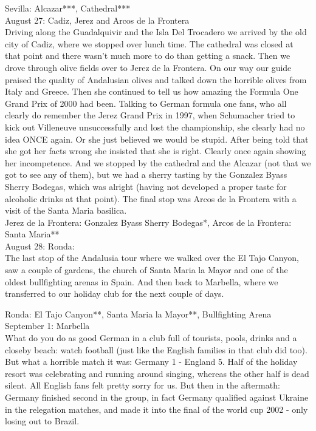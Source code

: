 Sevilla: Alcazar***, Cathedral***\\

August 27: Cadiz, Jerez and Arcos de la Frontera\\
Driving along the Guadalquivir and the Isla Del Trocadero we arrived by the old city of Cadiz, where we stopped over lunch time. The cathedral was closed at that point and there wasn't much more to do than getting a snack. Then we drove through olive fields over to Jerez de la Frontera. On our way our guide praised the quality of Andalusian olives and talked down the horrible olives from Italy and Greece. Then she continued to tell us how amazing the Formula One Grand Prix of 2000 had been. Talking to German formula one fans, who all clearly do remember the Jerez Grand Prix in 1997, when Schumacher tried to kick out Villeneuve unsuccessfully and lost the championship, she clearly had no idea ONCE again. Or she just believed we would be stupid. After being told that she got her facts wrong she insisted that she is right. Clearly once again showing her incompetence. And we stopped by the cathedral and the Alcazar (not that we got to see any of them), but we had a sherry tasting by the Gonzalez Byass Sherry Bodegas, which was alright (having not developed a proper taste for alcoholic drinks at that point). The final stop was Arcos de la Frontera with a visit of the Santa Maria basilica.\\

Jerez de la Frontera: Gonzalez Byass Sherry Bodegas*, Arcos de la Frontera: Santa Maria**\\

August 28: Ronda:\\
The last stop of the Andalusia tour where we walked over the El Tajo Canyon, saw a couple of gardens, the church of Santa Maria la Mayor and one of the oldest bullfighting arenas in Spain. And then back to Marbella, where we transferred to our holiday club for the next couple of days.

Ronda: El Tajo Canyon**,  Santa Maria la Mayor**, Bullfighting Arena\\

September 1: Marbella\\
What do you do as good German in a club full of tourists, pools, drinks and a closeby beach: watch football (just like the English families in that club did too). But what a horrible match it was: Germany 1 - England 5. Half of the holiday resort was celebrating and running around singing, whereas the other half is dead silent. All English fans felt pretty sorry for us. But then in the aftermath: Germany finished second in the group, in fact Germany qualified against Ukraine in the relegation matches, and made it into the final of the world cup 2002 - only losing out to Brazil.